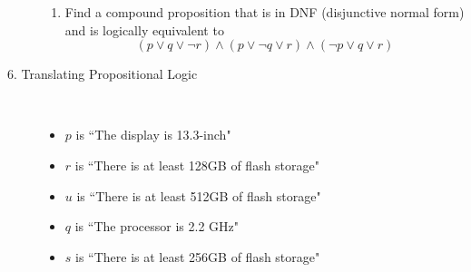 \documentclass[12pt, oneside]{article}
\newif \ifsolution
\newcommand{\sol}[1]{\medskip\fbox{\begin{minipage}{5.5in}{#1}\end{minipage}}\medskip}
\begin{document}
\begin{description}
\begin{enumerate}
\item Find a compound proposition that is in DNF (disjunctive normal form) and is logically equivalent
to 
\[
(p \vee q \vee \neg r) \wedge (p \vee \neg q \vee r ) \wedge (\neg p \vee q \vee r)
\]

\ifsolution{
\sol{
The given compound proposition is in CNF and indicates that the rows in the truth table 
with $p=F, q=F, r = T$, $p=F, q= T, r= F$, and $p =T, q=F, r=F$ are set to F.  Thus, the truth table is 

\begin{center}
\begin{tabular}{ccc||c}
$p$ & $q$ & $r$ & Output \\
\hline 
$T$ & $T$ & $T$& $T$ \\
$T$ & $T$ & $F$& $T$ \\
$T$ & $F$ & $T$& $T$ \\
$T$ & $F$ & $F$& $F$ \\
$F$ & $T$ & $T$& $T$ \\
$F$ & $T$ & $F$& $F$ \\
$F$ & $F$ & $T$& $F$ \\
$F$ & $F$ & $F$& $T$ \\
\end{tabular}
\end{center}

To find a logically equivalence compound proposition in DNF, we represent the disjunction
of landing in each of the rows that evaluate to $T$: the rows where
$p =T, q=T, r=T$, or $p=T, q=T, r=F$, or $p=T, q=F, r=T$, or $p=F, q=T, r=T$, or $p=F, q=F, r=F$.
\begin{align*}
(p \land &q \land r)  \vee ( p \land q \land \neg r) \vee (p \land \neg q \land r) \\
&\vee (\neg p \land q \land r) \vee (\neg p \land \neg q \land \neg r)
\end{align*}
}}
\fi

\end{enumerate}

\item[6. Translating Propositional Logic]  \qquad \\

\begin{multicols}{2}
  \begin{itemize}
  \item[] $p$ is ``The display is 13.3-inch"
  \item[] $r$ is ``There is at least 128GB of flash storage"
  \item[] $u$ is ``There is at least 512GB of flash storage"
  \columnbreak
  \item[] $q$ is ``The processor is 2.2 GHz"
  \item[] $s$ is ``There is at least 256GB of flash storage"
  \end{itemize}
\end{multicols}
  

\end{description}
\end{document}
